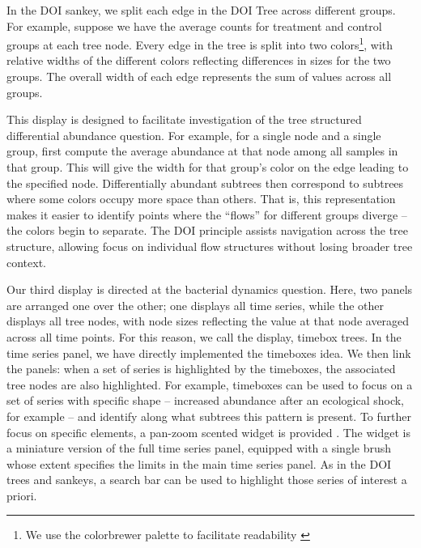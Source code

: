 \documentclass[12pt]{article}
\begin{document}
In the DOI sankey, we split each edge in the DOI Tree across different groups.
For example, suppose we have the average counts for treatment and control groups
at each tree node. Every edge in the tree is split into two colors\footnote{We
  use the colorbrewer palette to facilitate readability
  \citep{brewer2003colorbrewer}}, with relative widths of the different colors
reflecting differences in sizes for the two groups. The overall width of each
edge represents the sum of values across all groups.

This display is designed to facilitate investigation of the tree structured
differential abundance question. For example, for a single node and a single
group, first compute the average abundance at that node among all samples in
that group. This will give the width for that group's color on the edge leading
to the specified node. Differentially abundant subtrees then correspond to
subtrees where some colors occupy more space than others. That is, this
representation makes it easier to identify points where the ``flows'' for
different groups diverge -- the colors begin to separate. The DOI principle
assists navigation across the tree structure, allowing focus on individual flow
structures without losing broader tree context.

Our third display is directed at the bacterial dynamics question. Here, two
panels are arranged one over the other; one displays all time series, while the
other displays all tree nodes, with node sizes reflecting the value at that node
averaged across all time points. For this reason, we call the display, timebox
trees. In the time series panel, we have directly implemented the timeboxes
idea. We then link the panels: when a set of series is highlighted by the
timeboxes, the associated tree nodes are also highlighted. For example,
timeboxes can be used to focus on a set of series with specific shape --
increased abundance after an ecological shock, for example -- and identify along
what subtrees this pattern is present. To further focus on specific elements, a
pan-zoom scented widget is provided \citep{willett2007scented}. The widget is a
miniature version of the full time series panel, equipped with a single brush
whose extent specifies the limits in the main time series panel. As in the DOI
trees and sankeys, a search bar can be used to highlight those series of
interest a priori.
\end{document}
